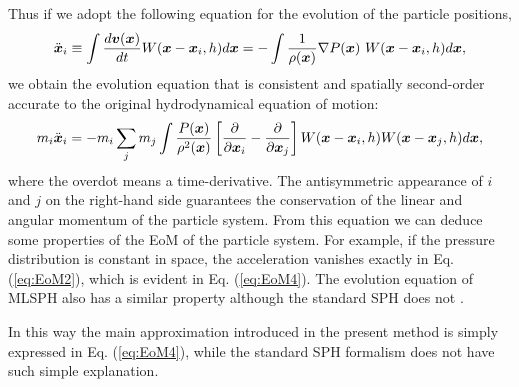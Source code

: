 \documentclass{cjour}
\newcommand{ \Vec   }[1]{ \mbox{\boldmath $ #1 $} }
\newcommand{ \PD    }[2]{ \frac{ \partial #1 }{ \partial #2 } }
\begin{document}
\begin{article}
Thus if we adopt the following equation for the evolution 
of the particle positions,  
\begin{equation}
       \ddot{\Vec{x}}_i
   \equiv   \int \frac{ d \Vec{v}(\Vec{x}) }{ dt } 
                                W(\Vec{x}-\Vec{x}_i,h) d\Vec{x} 
   = - \int \frac{1}{\rho(\Vec{x})} \nabla P(\Vec{x}) ~
                                W(\Vec{x}-\Vec{x}_i,h) d\Vec{x} ,   
                                                \label{eq:EoM4}
\end{equation}
we obtain the evolution equation 
that is consistent and spatially second-order accurate 
to the original hydrodynamical equation of motion: 
\begin{equation}
              m_i \ddot{\Vec{x}}_i  = 
              - m_i \sum_{j} m_j 
                         \int \frac{ P(\Vec{x}) }{ \rho^2(\Vec{x}) }
                         \left[  \PD{}{\Vec{x}_i} 
                               - \PD{}{\Vec{x}_j}  \right]
                         W(\Vec{x}-\Vec{x}_i, h)
                         W(\Vec{x}-\Vec{x}_j, h) d\Vec{x} , 
                                                        \label{eq:EoM2}
\end{equation}
where the overdot %
means a time-derivative.  
The antisymmetric appearance of $i$ and $j$ on the right-hand side 
guarantees the conservation of the linear and angular momentum of 
the particle system. 
From this equation we can deduce some properties 
of the EoM of the particle system.  
For example, if the pressure distribution is constant in space, 
the acceleration vanishes exactly in Eq. (\ref{eq:EoM2}), 
which is evident in Eq. (\ref{eq:EoM4}).  
The evolution equation of MLSPH also has 
a similar property although the standard SPH does not 
\cite{Dilts:1999}.   


In this way the main approximation introduced in the present method 
is simply expressed in Eq. (\ref{eq:EoM4}), 
while the standard SPH formalism does not have such simple 
explanation. 






\end{article}
\end{document}
